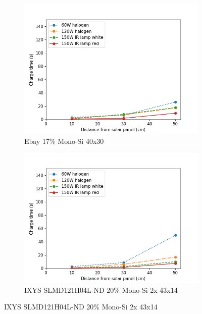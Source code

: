 \begin{figure}
	\centering
	\begin{subfigure}[b]{0.60\textwidth}
		\includegraphics[width=\textwidth]{pics/light_experiment_figure1.png}
		\caption{Ebay 17\% Mono-Si 40x30}
		\label{fig:light_exp1}
	\end{subfigure}

	\begin{subfigure}[b]{0.60\textwidth}
		\includegraphics[width=\textwidth]{pics/light_experiment_figure2.png}
		\caption{IXYS SLMD121H04L-ND 20\% Mono-Si 2x 43x14}
		\label{fig:light_exp2}
	\end{subfigure}


\end{figure}
